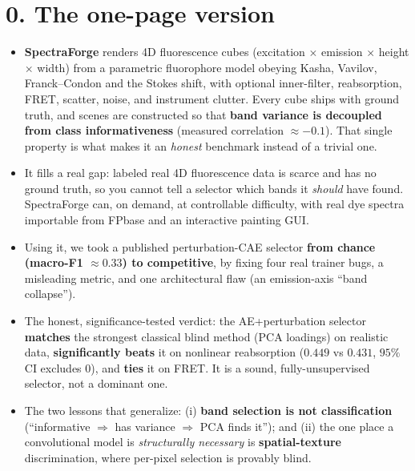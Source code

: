 \documentclass[11pt]{article}
\begin{document}
\section*{0. The one-page version}
\begin{itemize}[leftmargin=1.4em,itemsep=0.2em]
\item \textbf{SpectraForge} renders 4D fluorescence cubes (excitation $\times$ emission $\times$
height $\times$ width) from a parametric fluorophore model obeying Kasha, Vavilov,
Franck--Condon and the Stokes shift, with optional inner-filter, reabsorption, FRET, scatter,
noise, and instrument clutter. Every cube ships with ground truth, and scenes are constructed
so that \textbf{band variance is decoupled from class informativeness} (measured correlation
$\approx -0.1$). That single property is what makes it an \emph{honest} benchmark instead of a
trivial one.
\item It fills a real gap: labeled real 4D fluorescence data is scarce and has no ground truth,
so you cannot tell a selector which bands it \emph{should} have found. SpectraForge can, on
demand, at controllable difficulty, with real dye spectra importable from FPbase and an
interactive painting GUI.
\item Using it, we took a published perturbation-CAE selector \textbf{from chance
(macro-F1 $\approx 0.33$) to competitive}, by fixing four real trainer bugs, a misleading
metric, and one architectural flaw (an emission-axis ``band collapse'').
\item The honest, significance-tested verdict: the AE+perturbation selector \textbf{matches}
the strongest classical blind method (PCA loadings) on realistic data, \textbf{significantly
beats} it on nonlinear reabsorption ($0.449$ vs $0.431$, $95\%$ CI excludes $0$), and
\textbf{ties} it on FRET. It is a sound, fully-unsupervised selector, not a dominant one.
\item The two lessons that generalize: (i) \textbf{band selection is not classification}
(``informative $\Rightarrow$ has variance $\Rightarrow$ PCA finds it''); and (ii) the one place
a convolutional model is \emph{structurally necessary} is \textbf{spatial-texture}
discrimination, where per-pixel selection is provably blind.
\end{itemize}
\end{document}
